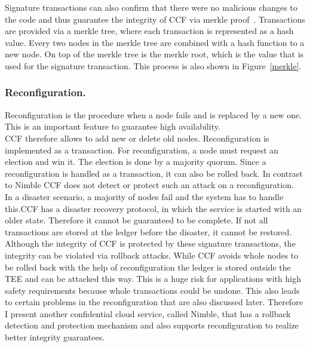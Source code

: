   Signature transactions can also confirm that there were no malicious changes to the code and thus guarantee the integrity of CCF via merkle proof~\cite{merkle}. Transactions are provided via a merkle tree, where each transaction is represented as a hash value. Every two nodes in the merkle tree are combined with a hash function to a new node. On top of the merkle tree is the merkle root, which is the value that is used for the signature transaction. This process is also shown in Figure~\ref{merkle}.\\
  
   
  \subsubsection*{Reconfiguration.}
  Reconfiguration is the procedure when a node fails and is replaced by a new one. This is an important feature to guarantee high availability.\\
CCF therefore allows to add new or delete old nodes. Reconfiguration is implemented as a transaction. For reconfiguration, a node must request an election and win it. The election is done by a majority quorum. Since a reconfiguration is handled as a transaction, it can also be rolled back. In contrast to Nimble CCF does not detect or protect such an attack on a reconfiguration.\\%
In a disaster scenario, a majority of nodes fail and the system has to handle this.CCF has a disaster recovery protocol, in which the service is started with an older state. Therefore it cannot be guaranteed to be complete. If not all transactions are stored at the ledger before the disaster, it cannot be restored. \\
  Although the integrity of CCF is protected by these signature transactions, the integrity can be violated via rollback attacks. While CCF avoids whole nodes to be rolled back with the help of reconfiguration the ledger is stored outside the TEE and can be attacked this way. This is a huge risk for applications with high safety requirements because whole transactions could be undone. This also leads to certain problems in the reconfiguration that are also discussed later. Therefore I present another confidential cloud service, called Nimble, that has a rollback detection and protection mechanism and also supports reconfiguration to realize better integrity guarantees.
 

